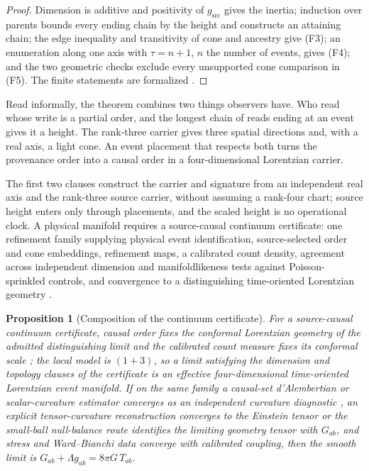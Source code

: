\documentclass[11pt]{article}
\newtheorem{proposition}[theorem]{Proposition}
\theoremstyle{definition}
\theoremstyle{remark}
\begin{document}
\begin{proof}
Dimension is additive and positivity of $g_{\mathrm{src}}$ gives the
inertia; induction over parents bounds every ending chain by the height and
constructs an attaining chain; the edge inequality and transitivity of cone
and ancestry give (F3); an enumeration along one axis with $\tau=n+1$, $n$ the number of events, gives (F4); and the two geometric checks exclude every unsupported cone comparison
in (F5). The finite statements are formalized \cite{ophrepo,ophEinstein}.
\end{proof}

Read informally, the theorem combines two things observers have. Who read
whose write is a partial order, and the longest chain of reads ending at an
event gives it a height. The rank-three carrier gives three spatial
directions and, with a real axis, a light cone. An event placement that
respects both turns the provenance order into a causal order in a
four-dimensional Lorentzian carrier.

The first two clauses construct the carrier and signature from an
independent real axis and the rank-three source carrier, without assuming a
rank-four chart; source height enters only through placements, and the
scaled height is no operational clock. A physical manifold requires a
source-causal continuum certificate: one refinement family supplying
physical event identification, source-selected order and cone embeddings,
refinement maps, a calibrated count density, agreement across independent
dimension and manifoldlikeness tests against Poisson-sprinkled controls, and
convergence to a distinguishing time-oriented Lorentzian geometry
\cite{bombelli1987,surya2019,majorrideoutsurya2007}.

\begin{proposition}[Composition of the continuum certificate]
\label{thm:source-causal-continuum}
For a source-causal continuum certificate, causal order fixes the conformal
Lorentzian geometry of the admitted distinguishing limit and the calibrated
count measure fixes its conformal scale
\cite{hawkingkingmccarthy1976,malament1977}; the local model is $(1+3)$, so a
limit satisfying the dimension and topology clauses of the certificate is an effective four-dimensional time-oriented Lorentzian event manifold. If on the same family a causal-set d'Alembertian or scalar-curvature
estimator converges as an independent curvature diagnostic
\cite{benincasadowker2010,dowkerglaser2013}, an explicit tensor-curvature
reconstruction converges to the Einstein tensor or the small-ball
null-balance route identifies the limiting geometry tensor with $G_{ab}$, and stress and Ward--Bianchi data converge with calibrated
coupling, then the smooth limit is $G_{ab}+\Lambda g_{ab}=8\pi G\,T_{ab}$.
\end{proposition}
\end{document}
